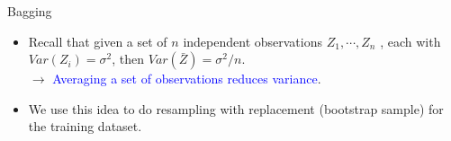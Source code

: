 \begin{frame}{Bagging}
    \begin{itemize}
        \item Recall that given a set of $n$ independent observations $Z_1 , \cdots , Z_n$ , each with $Var(Z_i) = \sigma^2$, then $Var(\bar{Z}) = \sigma^2/n$. \pause \\ 
        $\rightarrow$ \textcolor{blue}{Averaging a set of observations reduces variance}.\pause 

        \item We use this idea to do resampling with replacement (bootstrap sample) for the training dataset. \pause 

  \end{itemize}
\end{frame}



